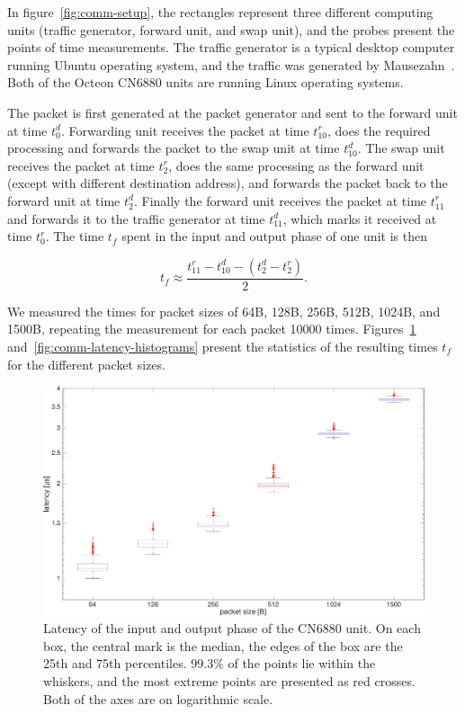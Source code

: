 In figure~\ref{fig:comm-setup}, the rectangles represent three different computing units (traffic generator, forward unit, and swap unit), and the probes present the points of time measurements. The traffic generator is a typical desktop computer running Ubuntu operating system, and the traffic was generated by Mausezahn~\cite{mausezahn}. Both of the Octeon CN6880 units are running Linux operating systems.

The packet is first generated at the packet generator and sent to the forward unit at time $t^{d}_{0}$. Forwarding unit receives the packet at time $t^{r}_{10}$, does the required processing and forwards the packet to the swap unit at time $t^{d}_{10}$. The swap unit receives the packet at time $t^{r}_{2}$, does the same processing as the forward unit (except with different destination address), and forwards the packet back to the forward unit at time $t^{d}_{2}$. Finally the forward unit receives the packet at time $t^{r}_{11}$ and forwards it to the traffic generator at time $t^{d}_{11}$, which marks it received at time $t^{r}_{0}$. The time $t_{f}$ spent in the input and output phase of one unit is then

\begin{equation}
  \label{eq:1}
  t_{f} \approx \frac{t^{r}_{11} - t^{d}_{10} - (t^{d}_{2} - t^{r}_{2})}{2}.
\end{equation}

We measured the times for packet sizes of 64B, 128B, 256B, 512B, 1024B, and 1500B, repeating the measurement for each packet 10000 times. Figures~\ref{fig:comm-latency-boxplot} and~\ref{fig:comm-latency-histograms} present the statistics of the resulting times $t_{f}$ for the different packet sizes.

\begin{figure}[]
  \begin{center}
    \includegraphics[width=\textwidth]{images/comm-latency-boxplot.pdf}
    \caption{Latency of the input and output phase of the CN6880 unit. On each box, the central mark is the median, the edges of the box are the 25th and 75th percentiles. 99.3\% of the points lie within the whiskers, and the most extreme points are presented as red crosses. Both of the axes are on logarithmic scale.}
    \label{fig:comm-latency-boxplot}
  \end{center}
\end{figure}

